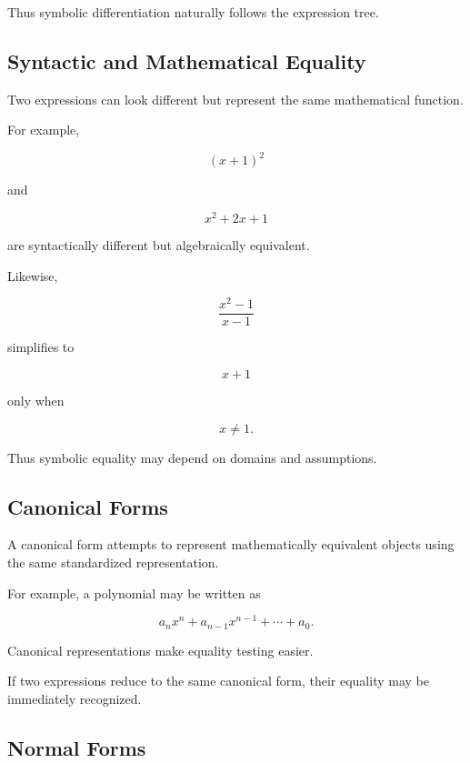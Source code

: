 Thus symbolic differentiation naturally follows the expression tree.

\subsection{Syntactic and Mathematical Equality}
\label{subsec:syntactic-mathematical-equality}

Two expressions can look different but represent the same mathematical
function.

For example,

\[
\boxed{
(x+1)^2
}
\]

and

\[
\boxed{
x^2+2x+1
}
\]

are syntactically different but algebraically equivalent.

Likewise,

\[
\boxed{
\frac{x^2-1}{x-1}
}
\]

simplifies to

\[
x+1
\]

only when

\[
\boxed{
x\neq1.
}
\]

Thus symbolic equality may depend on domains and assumptions.

\subsection{Canonical Forms}
\label{subsec:canonical-forms}

A canonical form attempts to represent mathematically equivalent objects
using the same standardized representation.

For example, a polynomial may be written as

\[
\boxed{
a_nx^n
+
a_{n-1}x^{n-1}
+
\cdots
+
a_0.
}
\]

Canonical representations make equality testing easier.

If two expressions reduce to the same canonical form, their equality may
be immediately recognized.

\subsection{Normal Forms}
\label{subsec:symbolic-normal-forms}

